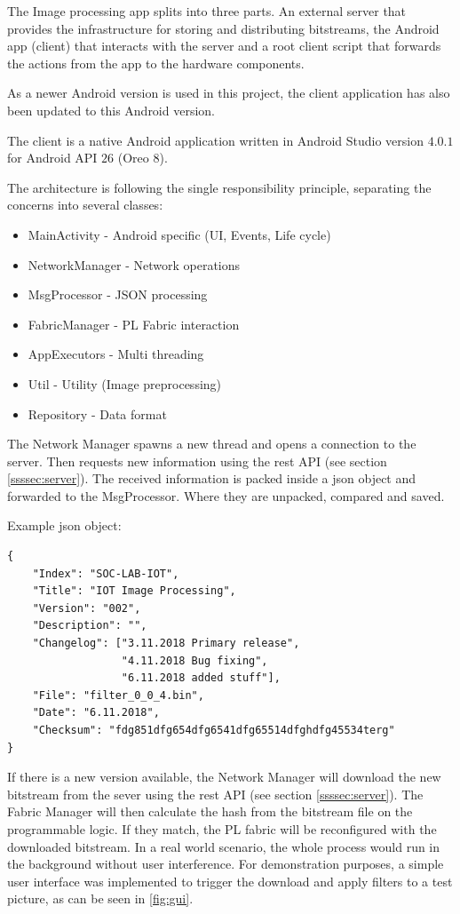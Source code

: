 The Image processing app splits into three parts. An external server that provides the infrastructure for storing and distributing bitstreams, the Android app (client) that interacts with the server and a root client script that forwards the actions from the app to the hardware components. 

\label{ssssec:clientapp}
As a newer Android version is used in this project, the client application has also been updated to this Android version.

The client is a native Android application written in Android Studio version $4.0.1$ for Android API $26$ (Oreo $8$).

The architecture is following the single responsibility principle, separating the concerns into several classes:

\begin{itemize}
    \item MainActivity 	    - Android specific (UI, Events, Life cycle)
    \item NetworkManager	- Network operations 
    \item MsgProcessor	    - JSON processing 
    \item FabricManager	    - PL Fabric interaction
    \item AppExecutors	    - Multi threading
    \item Util			    - Utility (Image preprocessing)
    \item Repository        - Data format
\end{itemize}

The Network Manager spawns a new thread and opens a connection to the server. Then requests new information using the \gls{rest} API (see section \ref{ssssec:server}). The received information is packed inside a \gls{json} object and forwarded to the MsgProcessor. Where they are unpacked, compared and saved.

Example \gls{json} object:
\begin{verbatim}
{
    "Index": "SOC-LAB-IOT",
    "Title": "IOT Image Processing",
    "Version": "002",
    "Description": "",
    "Changelog": ["3.11.2018 Primary release", 
                  "4.11.2018 Bug fixing", 
                  "6.11.2018 added stuff"],
    "File": "filter_0_0_4.bin",
    "Date": "6.11.2018",
    "Checksum": "fdg851dfg654dfg6541dfg65514dfghdfg45534terg"
}  
\end{verbatim}

If there is a new version available, the Network Manager will download the new bitstream from the sever using the \gls{rest} API (see section \ref{ssssec:server}). The Fabric Manager will then calculate the hash from the bitstream file on the programmable logic. If they match, the PL fabric will be reconfigured with the downloaded bitstream. In a real world scenario, the whole process would run in the background without user interference. For demonstration purposes, a simple user interface was implemented to trigger the download and apply filters to a test picture, as can be seen in \cref{fig:gui}.


